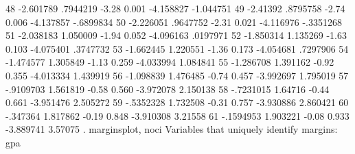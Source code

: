          48  {\VBAR}  -2.601789   .7944219    -3.28   0.001    -4.158827   -1.044751
         49  {\VBAR}   -2.41392   .8795758    -2.74   0.006    -4.137857   -.6899834
         50  {\VBAR}  -2.226051   .9647752    -2.31   0.021    -4.116976   -.3351268
         51  {\VBAR}  -2.038183   1.050009    -1.94   0.052    -4.096163    .0197971
         52  {\VBAR}  -1.850314   1.135269    -1.63   0.103    -4.075401    .3747732
         53  {\VBAR}  -1.662445   1.220551    -1.36   0.173    -4.054681    .7297906
         54  {\VBAR}  -1.474577   1.305849    -1.13   0.259    -4.033994    1.084841
         55  {\VBAR}  -1.286708   1.391162    -0.92   0.355    -4.013334    1.439919
         56  {\VBAR}  -1.098839   1.476485    -0.74   0.457    -3.992697    1.795019
         57  {\VBAR}  -.9109703   1.561819    -0.58   0.560    -3.972078    2.150138
         58  {\VBAR}  -.7231015    1.64716    -0.44   0.661    -3.951476    2.505272
         59  {\VBAR}  -.5352328   1.732508    -0.31   0.757    -3.930886    2.860421
         60  {\VBAR}   -.347364   1.817862    -0.19   0.848    -3.910308     3.21558
         61  {\VBAR}  -.1594953   1.903221    -0.08   0.933    -3.889741     3.57075
{\smallskip}
. marginsplot, noci
{\smallskip}
  Variables that uniquely identify margins: gpa
{\smallskip}
